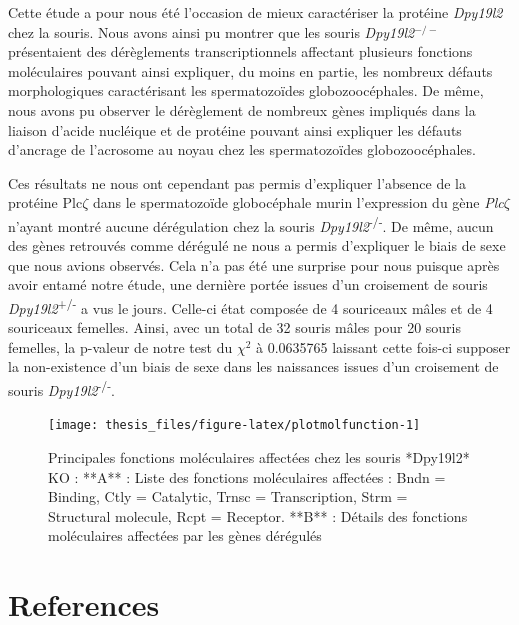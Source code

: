 \documentclass[12pt,twoside]{ugathesis}
\theoremstyle{definition}
\theoremstyle{definition}
\theoremstyle{remark}
\begin{document}
Cette étude a pour nous été l'occasion de mieux caractériser la protéine
\emph{Dpy19l2} chez la souris. Nous avons ainsi pu montrer que les
souris \emph{Dpy19l2}\(^{-/-}\) présentaient des dérèglements
transcriptionnels affectant plusieurs fonctions moléculaires pouvant
ainsi expliquer, du moins en partie, les nombreux défauts morphologiques
caractérisant les spermatozoïdes globozoocéphales. De même, nous avons
pu observer le dérèglement de nombreux gènes impliqués dans la liaison
d'acide nucléique et de protéine pouvant ainsi expliquer les défauts
d'ancrage de l'acrosome au noyau chez les spermatozoïdes
globozoocéphales.

Ces résultats ne nous ont cependant pas permis d'expliquer l'absence de
la protéine Plc\(\zeta\) dans le spermatozoïde globocéphale murin
l'expression du gène \emph{Plc}\(\zeta\) n'ayant montré aucune
dérégulation chez la souris \emph{Dpy19l2}\textsuperscript{-/-}. De
même, aucun des gènes retrouvés comme dérégulé ne nous a permis
d'expliquer le biais de sexe que nous avions observés. Cela n'a pas été
une surprise pour nous puisque après avoir entamé notre étude, une
dernière portée issues d'un croisement de souris
\emph{Dpy19l2}\textsuperscript{+/-} a vus le jours. Celle-ci état
composée de 4 souriceaux mâles et de 4 souriceaux femelles. Ainsi, avec
un total de 32 souris mâles pour 20 souris femelles, la p-valeur de
notre test du \(\chi^2\) à 0.0635765 laissant cette fois-ci supposer la
non-existence d'un biais de sexe dans les naissances issues d'un
croisement de souris \emph{Dpy19l2}\textsuperscript{-/-}.

\newpage 

\begin{figure}

{\centering \texttt{[image: thesis\_files/figure-latex/plotmolfunction-1]} 

}

\caption[Principales fonctions moléculaires affectées chez les souris *Dpy19l2* KO]{Principales fonctions moléculaires affectées chez les souris *Dpy19l2* KO  :  **A** : Liste des fonctions moléculaires affectées : Bndn = Binding, Ctly = Catalytic, Trnsc = Transcription, Strm = Structural molecule, Rcpt = Receptor. **B** : Détails des fonctions moléculaires affectées par les gènes dérégulés}\label{fig:plotmolfunction}
\end{figure}

\backmatter

\chapter*{References}\label{references}
\end{document}
